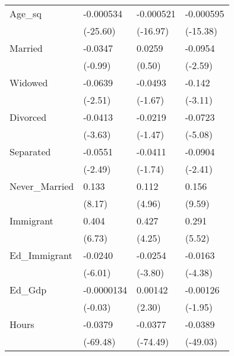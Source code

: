 \begin{longtable}{p{3 cm} p{2.25 cm} p{2.25 cm} p{2.25 cm}}
Age\_sq      &   -0.000534\sym{***}&   -0.000521\sym{***}&   -0.000595\sym{***}\\
            &    (-25.60)         &    (-16.97)         &    (-15.38)         \\
Married   &     -0.0347         &      0.0259         &     -0.0954\sym{**} \\
            &     (-0.99)         &      (0.50)         &     (-2.59)         \\
Widowed   &     -0.0639\sym{*}  &     -0.0493         &      -0.142\sym{**} \\
            &     (-2.51)         &     (-1.67)         &     (-3.11)         \\
Divorced   &     -0.0413\sym{***}&     -0.0219         &     -0.0723\sym{***}\\
            &     (-3.63)         &     (-1.47)         &     (-5.08)         \\
Separated  &     -0.0551\sym{*}  &     -0.0411         &     -0.0904\sym{*}  \\
            &     (-2.49)         &     (-1.74)         &     (-2.41)         \\
Never\_Married   &      0.133\sym{***}&      0.112\sym{***}&      0.156\sym{***}\\
            &     (8.17)         &     (4.96)         &     (9.59)         \\
Immigrant      &       0.404\sym{***}&       0.427\sym{***}&       0.291\sym{***}\\
            &      (6.73)         &      (4.25)         &      (5.52)         \\
Ed\_Immigrant   &     -0.0240\sym{***}&     -0.0254\sym{***}&     -0.0163\sym{***}\\
            &     (-6.01)         &     (-3.80)         &     (-4.38)         \\
Ed\_Gdp     &  -0.0000134         &     0.00142\sym{*}  &    -0.00126         \\
            &     (-0.03)         &      (2.30)         &     (-1.95)         \\

Hours       &     -0.0379\sym{***}&     -0.0377\sym{***}&     -0.0389\sym{***}\\
            &    (-69.48)         &    (-74.49)         &    (-49.03)         \\


\end{longtable}
